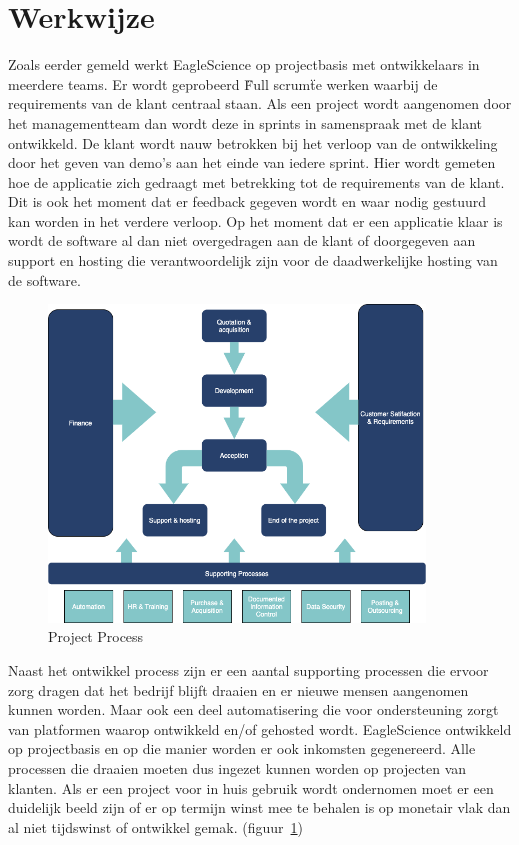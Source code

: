 \section{Werkwijze}\label{sec:werkwijze}

Zoals eerder gemeld werkt EagleScience op projectbasis met ontwikkelaars in meerdere teams. Er wordt geprobeerd \"Full scrum\" te werken waarbij de requirements van de klant centraal staan. Als een project wordt aangenomen door het managementteam dan wordt deze in sprints in samenspraak met de klant ontwikkeld. De klant wordt nauw betrokken bij het verloop van de ontwikkeling door het geven van demo's aan het einde van iedere sprint. Hier wordt gemeten hoe de applicatie zich gedraagt met betrekking tot de requirements van de klant. Dit is ook het moment dat er feedback gegeven wordt en waar nodig gestuurd kan worden in het verdere verloop. Op het moment dat er een applicatie klaar is wordt de software al dan niet overgedragen aan de klant of doorgegeven aan support en hosting die verantwoordelijk zijn voor de daadwerkelijke hosting van de software.

\begin{figure}[bth]
\myfloatalign
\includegraphics[width=10cm]{gfx/ProcessFlow}
\caption{Project Process}
\label{fig:Project Process}
\end{figure}

Naast het ontwikkel process zijn er een aantal supporting processen die ervoor zorg dragen dat het bedrijf blijft draaien en er nieuwe mensen aangenomen kunnen worden. Maar ook een deel automatisering die voor ondersteuning zorgt van platformen waarop ontwikkeld en/of gehosted wordt.  EagleScience ontwikkeld op projectbasis en op die manier worden er ook inkomsten gegenereerd. Alle processen die draaien moeten dus ingezet kunnen worden op projecten van klanten. Als er een project voor in huis gebruik wordt ondernomen moet er een duidelijk beeld zijn of er op termijn winst mee te behalen is op monetair vlak dan al niet tijdswinst of ontwikkel gemak. (figuur~\ref{fig:Project Process})

